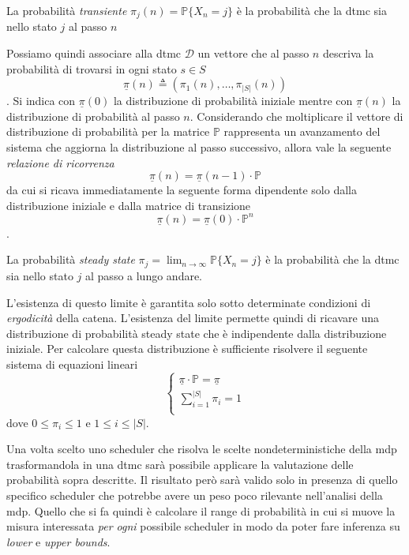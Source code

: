 \begin{mtdef}
La probabilità \emph{transiente} $\pi_j(n) = \mathbb{P}\{X_n = j\}$ è la probabilità che la \ac{dtmc} sia nello stato $j$ al passo $n$
\end{mtdef}

Possiamo quindi associare alla \ac{dtmc} $\mathcal{D}$ un vettore che al passo $n$ descriva la probabilità di trovarsi in ogni stato $s \in S$ $$\underline\pi(n) \triangleq (\pi_1(n), \dots, \pi_{|S|}(n))$$.
Si indica con $\underline\pi(0)$ la distribuzione di probabilità iniziale mentre con $\underline\pi(n)$ la distribuzione di probabilità al passo $n$.
Considerando che moltiplicare il vettore di distribuzione di probabilità per la matrice $\mathbb{P}$ rappresenta un avanzamento del sistema che aggiorna la distribuzione al passo successivo, allora vale la seguente \emph{relazione di ricorrenza}
$$ \underline\pi(n) = \underline\pi(n-1) \cdot \mathbb{P} $$
da cui si ricava immediatamente la seguente forma dipendente solo dalla  distribuzione iniziale e dalla matrice di transizione
$$ \underline\pi(n) = \underline\pi(0) \cdot \mathbb{P}^n$$.

\begin{mtdef}
La probabilità \emph{steady state} $\pi_j = \lim_{n\rightarrow\infty} \mathbb{P}\{X_n = j\}$ è la probabilità che la \ac{dtmc} sia nello stato $j$ al passo a lungo andare.
\end{mtdef}

L'esistenza di questo limite è garantita solo sotto determinate condizioni di \emph{ergodicità} della catena. L'esistenza del limite permette quindi di ricavare una distribuzione di probabilità steady state che è indipendente dalla distribuzione iniziale. Per calcolare questa distribuzione è sufficiente risolvere il seguente sistema di equazioni lineari
$$
\left\{
\begin{array}{l}
\underline\pi \cdot \mathbb{P} = \underline\pi \\
\sum^{|S|}_{i=1} \pi_i = 1 \\
\end{array}
\right.
$$
dove $0 \leq \pi_i \leq 1$ e $1 \leq i \leq |S|$.

Una volta scelto uno scheduler che risolva le scelte nondeterministiche della \ac{mdp} trasformandola in una \ac{dtmc} sarà possibile applicare la valutazione delle probabilità sopra descritte. Il risultato però sarà valido solo in presenza di quello specifico scheduler che potrebbe avere un peso poco rilevante nell'analisi della \ac{mdp}. Quello che si fa quindi è calcolare il range di probabilità in cui si muove la misura interessata \emph{per ogni} possibile scheduler in modo da poter fare inferenza su \emph{lower} e \emph{upper bounds}.

